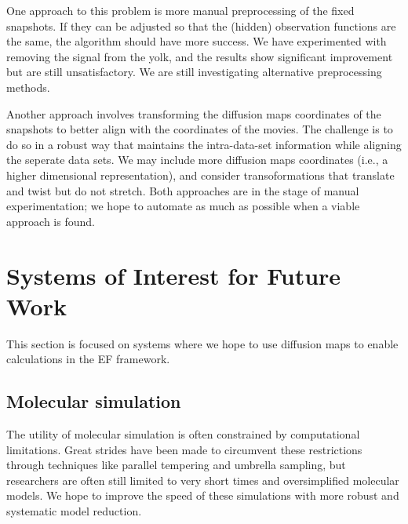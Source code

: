 \documentclass[12pt]{article}
\begin{document}
One approach to this problem is more manual preprocessing of the fixed snapshots. If they can be adjusted so that the (hidden) observation functions are the same, the algorithm should have more success. We have experimented with removing the signal from the yolk, and the results show significant improvement but are still unsatisfactory. We are still investigating alternative preprocessing methods. \vspace{1mm}

Another approach involves transforming the diffusion maps coordinates of the snapshots to better align with the coordinates of the movies. The challenge is to do so in a robust way that maintains the intra-data-set information while aligning the seperate data sets. We may include more diffusion maps coordinates (i.e., a higher dimensional representation), and consider transoformations that translate and twist but do not stretch. Both approaches are in the stage of manual experimentation; we hope to automate as much as possible when a viable approach is found. \vspace{1mm}

\section{Systems of Interest for Future Work}

This section is focused on systems where we hope to use diffusion maps to enable calculations in the EF framework.

\subsection{Molecular simulation}

The utility of molecular simulation is often constrained by computational limitations. Great strides have been made to circumvent these restrictions through techniques like parallel tempering and umbrella sampling, but researchers are often still limited to very short times and oversimplified molecular models. We hope to improve the speed of these simulations with more robust and systematic model reduction. \vspace{1mm}
\end{document}
